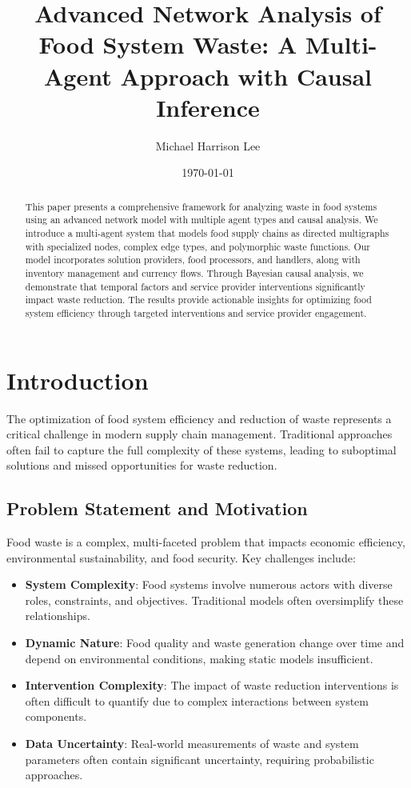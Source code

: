 \documentclass[12pt]{article}
\title{Advanced Network Analysis of Food System Waste: A Multi-Agent Approach with Causal Inference}
\author{Michael Harrison Lee}
\date{\today}
\theoremstyle{definition}
\begin{document}
\maketitle

\begin{abstract}
This paper presents a comprehensive framework for analyzing waste in food systems using an advanced network model with multiple agent types and causal analysis. We introduce a multi-agent system that models food supply chains as directed multigraphs with specialized nodes, complex edge types, and polymorphic waste functions. Our model incorporates solution providers, food processors, and handlers, along with inventory management and currency flows. Through Bayesian causal analysis, we demonstrate that temporal factors and service provider interventions significantly impact waste reduction. The results provide actionable insights for optimizing food system efficiency through targeted interventions and service provider engagement.
\end{abstract}

\section{Introduction}
The optimization of food system efficiency and reduction of waste represents a critical challenge in modern supply chain management. Traditional approaches often fail to capture the full complexity of these systems, leading to suboptimal solutions and missed opportunities for waste reduction.

\subsection{Problem Statement and Motivation}
Food waste is a complex, multi-faceted problem that impacts economic efficiency, environmental sustainability, and food security. Key challenges include:

\begin{itemize}
    \item \textbf{System Complexity}: Food systems involve numerous actors with diverse roles, constraints, and objectives. Traditional models often oversimplify these relationships.
    \item \textbf{Dynamic Nature}: Food quality and waste generation change over time and depend on environmental conditions, making static models insufficient.
    \item \textbf{Intervention Complexity}: The impact of waste reduction interventions is often difficult to quantify due to complex interactions between system components.
    \item \textbf{Data Uncertainty}: Real-world measurements of waste and system parameters often contain significant uncertainty, requiring probabilistic approaches.
\end{itemize}
\end{document}
